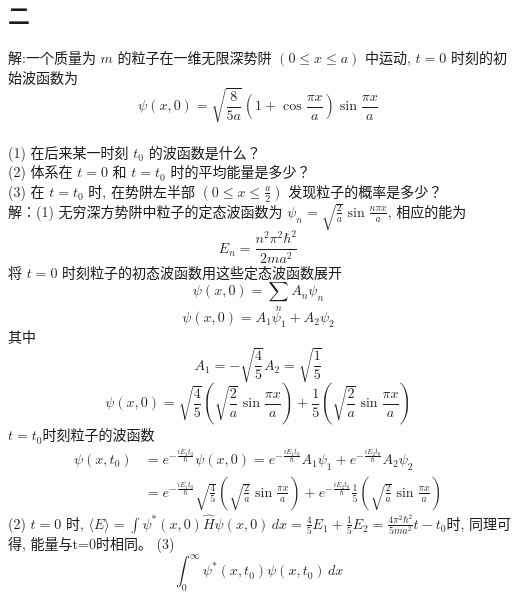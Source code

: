\subsection{二}
解:一个质量为 $m$ 的粒子在一维无限深势阱 $(0 \leq x \leq a)$ 中运动, $t = 0$ 时刻的初始波函数为
$$\psi(x, 0) = \sqrt{\frac{8}{5a}} \left(1 + \cos \frac{\pi x}{a}\right)\sin \frac{\pi x}{a}~$$\\
(1) 在后来某一时刻 $t_0$ 的波函数是什么？\\
(2) 体系在 $t = 0$ 和 $t = t_0$ 时的平均能量是多少？\\
(3) 在 $t = t_0$ 时, 在势阱左半部 $(0 \leq x \leq \frac{a}{2})$ 发现粒子的概率是多少？\\
解：(1) 无穷深方势阱中粒子的定态波函数为 $\psi_n = \sqrt{\frac{2}{a}} \sin \frac{n\pi x}{a}$, 相应的能为 
$$E_n = \frac{n^2 \pi^2 \hbar^2}{2ma^2}~$$
将 $t = 0$ 时刻粒子的初态波函数用这些定态波函数展开
$$\psi(x, 0) = \sum_n A_n \psi_n~$$
$$\psi(x, 0) = A_1 \psi_1 + A_2 \psi_2~$$
其中 
$$A_1 = -\sqrt{\frac{4}{5}} A_2 = \sqrt{\frac{1}{5}}~$$
$$\psi(x, 0) = \sqrt{\frac{4}{5}}\left(\sqrt{\frac{2}{a}}\sin \frac{\pi x}{a}\right)+\frac{1}{5}\left(\sqrt{\frac{2}{a}}\sin \frac{\pi x}{a}\right)~$$
$t=t_0$时刻粒子的波函数
\begin{align}
\psi(x,t_0) &= e^{-\frac{iE_1t_0}{\hbar}} \psi(x, 0) = e^{-\frac{iE_1t_0}{\hbar}} A_1 \psi_1 + e^{-\frac{iE_2t_0}{\hbar}} A_2 \psi_2 \\
&= e^{-\frac{iE_1t_0}{\hbar}} \sqrt{\frac{4}{5}}\left(\sqrt{\frac{2}{a}}\sin \frac{\pi x}{a}\right)+ e^{-\frac{iE_2t_0}{\hbar}}\frac{1}{5}\left(\sqrt{\frac{2}{a}}\sin \frac{\pi x}{a}\right)~
\end{align}
(2) $t=0$ 时, $\langle E \rangle = \int \psi^*(x, 0) \hat{H} \psi(x, 0) \,dx = \frac{4}{5} E_1 + \frac{1}{5} E_2 = \frac{4\pi^2 \hbar^2}{5ma^2} t - t_0$时,
同理可得, 能量与t=0时相同。
(3)$$\int_{0}^{\infty} \psi^*(x, t_0) \psi(x, t_0) \, dx~$$
